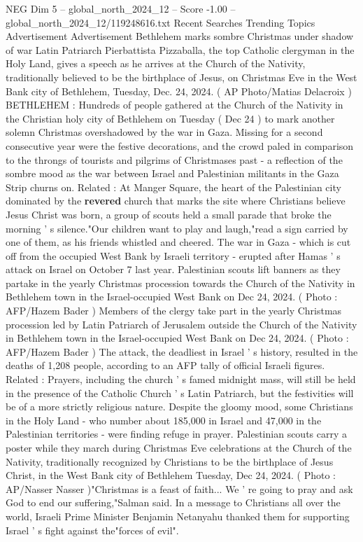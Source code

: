 \begin{textsample}{NEG Dim 5 – global\_north\_2024\_12 – Score -1.00 – global\_north\_2024\_12/119248616.txt}  \label{ex:f5_neg_331}
Recent Searches Trending Topics Advertisement Advertisement Bethlehem marks sombre Christmas under shadow of war Latin Patriarch Pierbattista Pizzaballa, the top Catholic clergyman in the Holy Land, gives a speech as he arrives at the Church of the Nativity, traditionally believed to be the birthplace of Jesus, on Christmas Eve in the West Bank city of Bethlehem, Tuesday, Dec. 24, 2024. ( AP Photo/Matias Delacroix ) BETHLEHEM : Hundreds of people gathered at the Church of the Nativity in the Christian holy city of Bethlehem on Tuesday ( Dec 24 ) to mark another solemn Christmas overshadowed by the war in Gaza.
Missing for a second consecutive year were the festive decorations, and the crowd paled in comparison to the throngs of tourists and pilgrims of Christmases past - a reflection of the sombre mood as the war between Israel and Palestinian militants in the Gaza Strip churns on.
Related : At Manger Square, the heart of the Palestinian city dominated by the \textbf{revered} church that marks the site where Christians believe Jesus Christ was born, a group of scouts held a small parade that broke the morning ' s silence."Our children want to play and laugh,"read a sign carried by one of them, as his friends whistled and cheered.
The war in Gaza - which is cut off from the occupied West Bank by Israeli territory - erupted after Hamas ' s attack on Israel on October 7 last year.
Palestinian scouts lift banners as they partake in the yearly Christmas procession towards the Church of the Nativity in Bethlehem town in the Israel-occupied West Bank on Dec 24, 2024. ( Photo : AFP/Hazem Bader ) Members of the clergy take part in the yearly Christmas procession led by Latin Patriarch of Jerusalem outside the Church of the Nativity in Bethlehem town in the Israel-occupied West Bank on Dec 24, 2024. ( Photo : AFP/Hazem Bader ) The attack, the deadliest in Israel ' s history, resulted in the deaths of 1,208 people, according to an AFP tally of official Israeli figures.
Related : Prayers, including the church ' s famed midnight mass, will still be held in the presence of the Catholic Church ' s Latin Patriarch, but the festivities will be of a more strictly religious nature.
Despite the gloomy mood, some Christians in the Holy Land - who number about 185,000 in Israel and 47,000 in the Palestinian territories - were finding refuge in prayer.
Palestinian scouts carry a poster while they march during Christmas Eve celebrations at the Church of the Nativity, traditionally recognized by Christians to be the birthplace of Jesus Christ, in the West Bank city of Bethlehem Tuesday, Dec 24, 2024. ( Photo : AP/Nasser Nasser )"Christmas is a feast of faith...
We ' re going to pray and ask God to end our suffering,"Salman said.
In a message to Christians all over the world, Israeli Prime Minister Benjamin Netanyahu thanked them for supporting Israel ' s fight against the"forces of evil".

\end{textsample}
